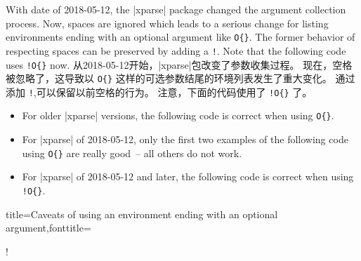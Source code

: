 \begin{marker}
\begin{stripedbox}
With date of 2018-05-12, the |xparse| %
package changed the argument collection process.
Now, spaces are ignored which leads to a serious change for listing environments
ending with an optional argument like \verb+O{}+.
The former behavior of respecting spaces can be preserved by adding a \flqq\verb+!+\frqq.
Note that the following code uses \verb+!O{}+ now.
\tcblower
从2018-05-12开始，|xparse|包改变了参数收集过程。%
现在，空格被忽略了，这导致以 \verb+O{}+ 这样的可选参数结尾的环境列表发生了重大变化。%
通过添加 \flqq\verb+!+\frqq ,可以保留以前空格的行为。%
注意，下面的代码使用了 \verb+!O{}+ 了。
\end{stripedbox}
\begin{itemize}
\item For older |xparse| versions, the following code is correct when using \verb+O{}+.
\item For |xparse| of 2018-05-12, only the first two examples of
  the following code using \verb+O{}+ are really \flqq good\frqq\ -- all others do not work.
\item For |xparse| of 2018-05-12 and later, the following code is correct when using \verb+!O{}+.
\end{itemize}
\end{marker}





\begin{dispListing*}{title={Caveats of using an environment ending with an
  optional argument},fonttitle=\bfseries}

\begin{mybox}[colframe=red]
\good
\end{mybox}

\begin{mybox}[colframe=red]\good\end{mybox}

\begin{mybox}
\good
\end{mybox}

\begin{mybox} \good\end{mybox}

\begin{mybox}\bad!\end{mybox}

\begin{mybox}
[\good]
\end{mybox}

\begin{mybox} [\good]\end{mybox}

\begin{mybox}[\bad!]\end{mybox}
\end{dispListing*}


